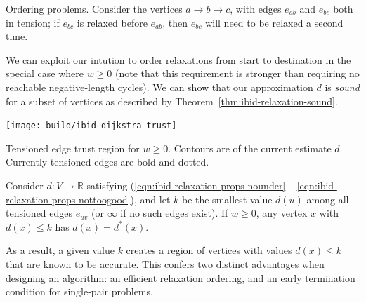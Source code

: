 \begin{marginfigure}
   \caption{Ordering problems.
      Consider the vertices $a \rightarrow b \rightarrow c$,
      with edges $e_{ab}$ and $e_{bc}$ both in tension;
      if $e_{bc}$ is relaxed before $e_{ab}$,
      then $e_{bc}$ will need to be relaxed a second time.}
   \label{fig:ibid:bellman-ford-repetitions}
\end{marginfigure}

We can exploit our intution to order relaxations from start to destination
in the special case where $w \geq 0$
(note that this requirement is stronger than requiring no reachable
negative-length cycles).
We can show that our approximation $d$
is \emph{sound} for a subset of vertices
as described by Theorem~\ref{thm:ibid-relaxation-sound}.

\begin{marginfigure}
   \centering
   \texttt{[image: build/ibid-dijkstra-trust]}
   \caption{Tensioned edge trust region
      for $w \geq 0$.
      Contours are of the current estimate $d$.
      Currently tensioned edges are bold and dotted.}
\end{marginfigure}

\begin{theorem}
Consider $d: V \rightarrow \mathbb{R}$
satisfying (\ref{eqn:ibid-relaxation-props-nounder} --
\ref{eqn:ibid-relaxation-props-nottoogood}),
and let $k$ be the smallest value $d(u)$
among all tensioned edges $e_{uv}$
(or $\infty$ if no such edges exist).
If $w \geq 0$,
any vertex $x$ with $d(x) \leq k$
has $d(x) = d^*(x)$.
\label{thm:ibid-relaxation-sound}
\end{theorem}
As a result,
a given value $k$ creates a region of vertices
with values $d(x) \leq k$ that are known to be
accurate.
This confers two distinct advantages when designing an algorithm:
an efficient relaxation ordering,
and an early termination condition for single-pair problems.

